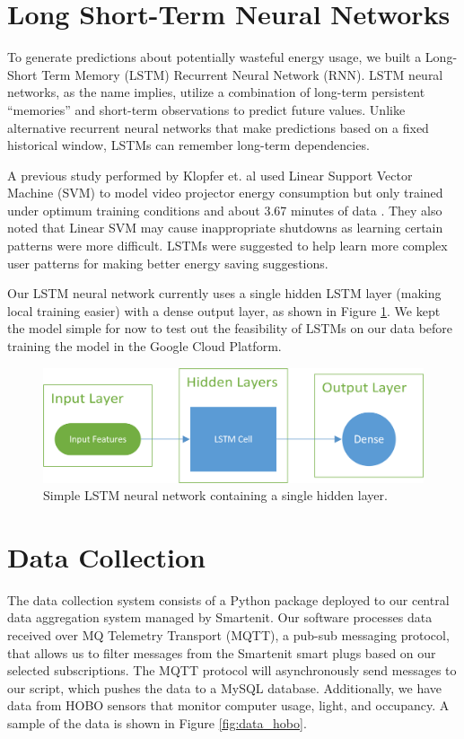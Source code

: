 \documentclass[conference]{IEEEtran}
\begin{document}
\section{Long Short-Term Neural Networks}
To generate predictions about potentially wasteful energy usage, we built a Long-Short Term Memory (LSTM) Recurrent Neural Network (RNN). LSTM neural networks, as the name implies, utilize a combination of long-term persistent “memories” and short-term observations to predict future values. Unlike alternative recurrent neural networks that make predictions based on a fixed historical window, LSTMs can remember long-term dependencies.

A previous study performed by Klopfer et. al used Linear Support Vector Machine (SVM) to model video projector energy consumption but only trained under optimum training conditions and about 3.67 minutes of data \cite{b3}. They also noted that Linear SVM may cause inappropriate shutdowns as learning certain patterns were more difficult. LSTMs were suggested to help learn more complex user patterns for making better energy saving suggestions.

Our LSTM neural network currently uses a single hidden LSTM layer (making local training easier) with a dense output layer, as shown in Figure \ref{fig:lstm_model}. We kept the model simple for now to test out the feasibility of LSTMs on our data before training the model in the Google Cloud Platform.

\begin{figure}[htbp]
    \includegraphics[width=\linewidth]{img/model.png}
    \caption{Simple LSTM neural network containing a single hidden layer.}
    \label{fig:lstm_model}
\end{figure}

\section{Data Collection}
The data collection system consists of a Python package deployed to our central data aggregation system managed by Smartenit. Our software processes data received over MQ Telemetry Transport (MQTT), a pub-sub messaging protocol, that allows us to filter messages from the Smartenit smart plugs based on our selected subscriptions. The MQTT protocol will asynchronously send messages to our script, which pushes the data to a MySQL database.  Additionally, we have data from HOBO sensors that monitor computer usage, light, and occupancy. A sample of the data is shown in Figure \ref{fig:data_hobo}.
\end{document}
